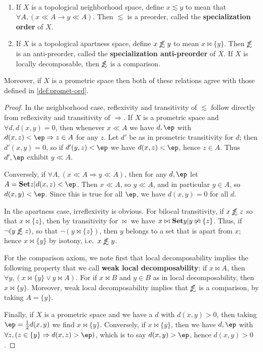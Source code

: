\documentclass{article}
\def\oapt{\mathrel{\!\not\,\not\lesssim}}
\def\leapx{\lesssim}
\let\implies\Rightarrow
\def\singleton#1{\{#1\}}
\begin{document}
\begin{thm}\label{thm:top-ord}\ 
  \begin{enumerate}
  \item If $X$ is a topological neighborhood space, define $x\leapx y$ to mean that $\forall A, (x\ll A \to y\ll A)$.
    Then $\leapx$ is a preorder, called the \textbf{specialization order} of $X$.
  \item If $X$ is a topological apartness space, define $x\oapt y$ to mean $x \bowtie \singleton{y}$.
    Then $\oapt$ is an anti-preorder, called the \textbf{specialization anti-preorder} of $X$.
    If $X$ is locally decomposable, then $\oapt$ is a comparison.
  \end{enumerate}
  Moreover, if $X$ is a prometric space then both of these relations agree with those defined in \cref{def:promet-ord}.
\end{thm}
\begin{proof}
  In the neighborhood case, reflexivity and transitivity of $\leapx$ follow directly from reflexivity and transitivity of $\implies$.
  If $X$ is a prometric space and $\forall d, d(x,y)=0$, then whenever $x\ll A$ we have $d,\ep$ with $d(x,z)<\ep \implies z\in A$ for any $z$.
  Let $d'$ be as in prometric transitivity for $d$; then $d'(x,y)=0$, so if $d'(y,z)<\ep$ we have $d(x,z)<\ep$, hence $z\in A$.
  Thus $d',\ep$ exhibit $y\ll A$.

  Conversely, if $\forall A, (x\ll A \implies y\ll A)$, then for any $d,\ep$ let $A = \setof{z|d(x,z)<\ep}$.
  Then $x\ll A$, so $y\ll A$, and in particular $y\in A$, so $d(x,y)<\ep$.
  Since this is true for all $\ep$, we have $d(x,y)=0$ for all $d$.

  In the apartness case, irreflexivity is obvious.
  For bilocal transitivity, if $x\oapt z$ so that $x\bowtie \singleton{z}$, then by transitivity for $\bowtie$ we have $x \bowtie \setof{y|y\not \bowtie \singleton{z}}$.
  Thus, if $\neg (y\oapt z)$, so that $\neg (y\bowtie \singleton{z})$, then $y$ belongs to a set that is apart from $x$; hence $x\bowtie \singleton{y}$ by isotony, i.e.\ $x\oapt y$.

  For the comparison axiom, we note first that local decomposability implies the following property that we call \textbf{weak local decomposability}: if $x\bowtie A$, then $\forall y, (x\bowtie \singleton{y} \lor y\bowtie A)$.
  For if $x\bowtie B$ and $y\in B$ as in local decomposability, then $x\bowtie \singleton{y}$.
  Moreover, weak local decomposability implies that $\oapt$ is a comparison, by taking $A = \singleton{y}$.

  Finally, if $X$ is a prometric space and we have a $d$ with $d(x,y)>0$, then taking $\ep=\frac12 d(x,y)$ we find $x\bowtie \singleton{y}$.
  Conversely, if $x\bowtie \singleton{y}$, then we have $d,\ep$ with $\forall z, (z\in \singleton{y} \implies d(x,z)>\ep)$, which is to say $d(x,y)>\ep$, hence $d(x,y)>0$.
\end{proof}
\end{document}
